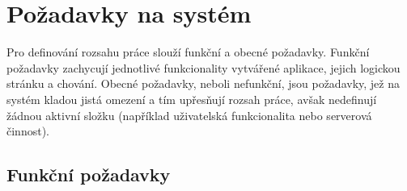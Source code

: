 \section{Požadavky na systém}

Pro definování rozsahu práce slouží funkční a obecné požadavky. Funkční požadavky zachycují jednotlivé funkcionality vytvářené aplikace, jejich logickou stránku a chování. Obecné požadavky, neboli nefunkční, jsou požadavky, jež na systém kladou jistá omezení a tím upřesňují rozsah práce, avšak nedefinují žádnou aktivní složku (například uživatelská funkcionalita nebo serverová činnost). 


\subsection{Funkční požadavky}

